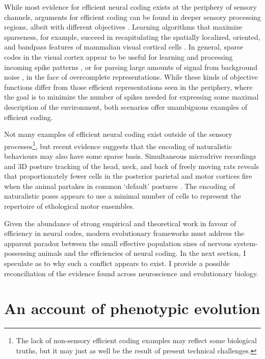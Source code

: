 \documentclass{article}
\begin{document}
While most evidence for efficient neural coding exists at the periphery of sensory channels, arguments for efficient coding can be found in deeper sensory processing regions, albeit with different objectives \cite{simoncelli_2003}. Learning algorithms that maximize sparseness, for example, succeed in recapitulating the spatially localized, oriented, and bandpass features of mammalian visual cortical cells \cite{olshausen_field_1996}. In general, sparse codes in the visual cortex appear to be useful for learning and processing incoming spike patterns \cite{olshausen_field_1996}, or for parsing large amounts of signal from background noise \cite{ringach_malone_2007}, in the face of overcomplete representations. While these kinds of objective functions differ from those efficient representations seen in the periphery, where the goal is to minimize the number of spikes needed for expressing some maximal description of the environment, both scenarios offer unambiguous examples of efficient coding. 

Not many examples of efficient neural coding exist outside of the sensory processes\footnote{The lack of non-sensory efficient coding examples may reflect some biological truths, but it may just as well be the result of present technical challenges.}, but recent evidence suggests that the encoding of naturalistic behaviours may also have some sparse basis. Simultaneous microdrive recordings and 3D posture tracking of the head, neck, and back of freely moving rats reveals that proportionately fewer cells in the posterior parietal and motor cortices fire when the animal partakes in common `default' postures \cite{Mimica_Dunn_Tombaz_Bojja_Whitlock_2018}. The encoding of naturalistic poses appears to use a minimal number of cells to represent the repertoire of ethological motor ensembles. 

Given the abundance of strong empirical and theoretical work in favour of efficiency in neural codes, modern evolutionary frameworks must address the apparent paradox between the small effective population sizes of nervous system-possessing animals and the efficiencies of neural coding. In the next section, I speculate as to why such a conflict appears to exist. I provide a possible reconciliation of the evidence found across neuroscience and evolutionary biology. 

\section{An account of phenotypic evolution}
\end{document}
